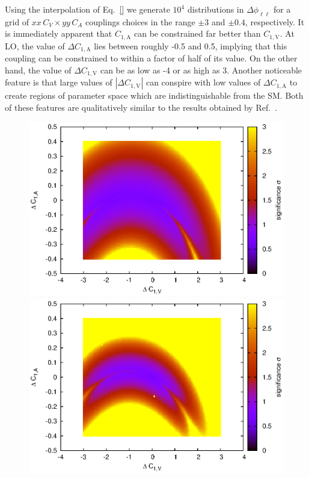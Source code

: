 \documentclass[preprint]{JHEP3} %
\def\ConeA{C_{1,\mathrm{A}}}
\def\ConeV{C_{1,\mathrm{V}}}
\def\DConeA{\Delta C_{1,\mathrm{A}}}
\def\DConeV{\Delta C_{1,\mathrm{V}}}
\begin{document}
Using the interpolation of Eq.~\ref{} we generate $10^4$ distributions in $\Delta \phi_{\ell\ell}$ for a grid of $xx \, C_V \times yy\, C_A$ couplings 
choices in the range $\pm 3$ and $\pm 0.4$, respectively. 
It is immediately apparent that $\ConeA$ can be constrained far better than $\ConeV$. 
At LO, the value of $\DConeA$ lies between roughly -0.5 and 0.5, implying that this coupling can be constrained to within a factor of half of its value. 
On the other hand, the value of $\DConeV$ can be as low as -4 or as high as 3. Another noticeable feature is that large values of $| \DConeV |$ can conspire 
with low values of $\DConeA$ to create regions of parameter space which are indistinguishable from the SM. 
Both of these features are qualitatively similar to the results obtained by Ref.~\cite{Baur:2004uw}. 
\begin{figure}[t]
\includegraphics[scale=0.6]{BLLLO1223HSsig_SUA2_300_1.30.eps} 
\includegraphics[scale=0.6]{BLLNLO1223sig_SUA2_300_1.15.eps} 

\end{figure}
\end{document}
